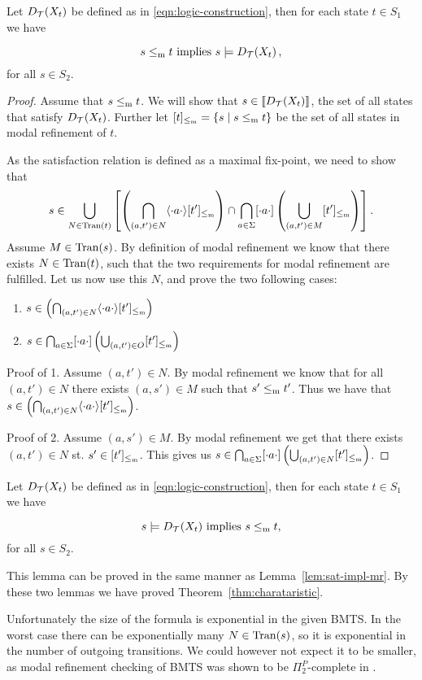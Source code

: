 \begin{lemma}\label{lem:sat-impl-mr}
		Let $D_\mathcal{T}(X_t)$ be defined as in \eqref{eqn:logic-construction}, then for each state $t \in S_1$ we have

	\[
		s \le_\mathrm m t \text{ implies } s \models D_\mathcal{T}(X_t)\, ,
	\]
	for all $s \in S_2$.
\end{lemma}
\begin{proof}
 	Assume that $s \le_\mathrm m t$. We will show that $s \in \llbracket D_\mathcal{T}(X_t) \rrbracket$, the set of all states that satisfy $D_\mathcal{T}(X_t)$. Further let $[t]_{\le_\mathrm m}= \{s \mid s \le_\mathrm m t\}$ be the set of all states in modal refinement of $t$.

As the satisfaction relation is defined as a maximal fix-point, we need to show that  
	\[
		s \in \bigcup_{ N \in \mathrm{Tran}(t)}
		\left [ 
			\left ( 
				\bigcap_{(a,t') \in N}\langle \cdot a \cdot \rangle[t']_{\le_\mathrm m}
			\right ) 
			\cap 
			\bigcap_{a \in \Sigma}[ \cdot a \cdot ]
				\left( 
					\bigcup_{(a,t') \in M}[t']_{\le_\mathrm m}
				\right)
		\right ].
	\]
	Assume $M \in \mathrm{Tran}(s)$. By definition of modal refinement we know that there exists $N \in \mathrm{Tran}(t)$, such that the two requirements for modal refinement are fulfilled. Let us now use this $N$, and prove the two following cases:
\begin{enumerate}
	\item $s \in 
		\left ( 
			\bigcap_{(a,t') \in N}\langle \cdot a \cdot \rangle[t']_{\le_\mathrm m}
		\right ) 
	$
	\item $s \in
	\bigcap_{a \in \Sigma}[ \cdot a \cdot ]
		\left ( 
			\bigcup_{(a,t') \in O}[t']_{\le_\mathrm m}
		\right ) $
		\end{enumerate}
		
	Proof of 1. Assume $(a,t') \in N$. By modal refinement we know that for all $(a,t') \in N$ there exists $(a,s') \in M$ such that $s' \le_\mathrm m t'$. Thus we have that
		$s \in 
			\left ( 
				\bigcap_{(a,t') \in N}\langle \cdot a \cdot \rangle[t']_{\le_\mathrm m}
			\right ) 
		$.
		
		
	Proof of 2. Assume $(a,s') \in M$. By modal refinement we get that there exists $(a,t') \in N$ st. $s' \in [t']_{\le_\mathrm m}$. This gives us $s \in
		\bigcap_{a \in \Sigma}[ \cdot a \cdot ]
			\left ( 
				\bigcup_{(a,t') \in N}[t']_{\le_\mathrm m}
			\right )$. 
\end{proof}

\begin{lemma}\label{lem:mr-impl-sat}
	Let $D_\mathcal{T}(X_t)$ be defined as in \eqref{eqn:logic-construction}, then for each state $t \in S_1$ we have
	
\[
	s \models D_\mathcal{T}(X_t) \text{ implies }  s \le_\mathrm m t,
\]
for all $s \in S_2$.
\end{lemma}
This lemma can be proved in the same manner as Lemma~\ref{lem:sat-impl-mr}.
By these two lemmas we have proved Theorem~\ref{thm:charataristic}.

Unfortunately the size of the formula is exponential in the given BMTS. In the worst case there can be exponentially many $N \in \mathrm{Tran}(s)$, so it is exponential in the number of outgoing transitions. We could however not expect it to be smaller, as modal refinement checking of BMTS was shown to be $\Pi^P_2$-complete in \cite{BKLMS:ATVA:11}.